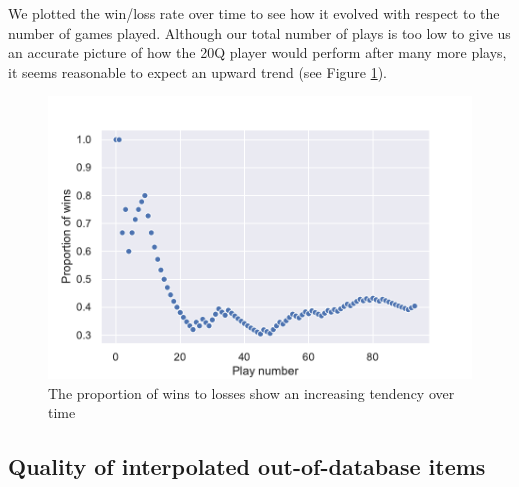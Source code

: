 \documentclass[11pt,a4paper]{article}
\begin{document}
We plotted the win/loss rate over time to see how it evolved with respect to the number of games played. Although our total number of plays is too low to give us an accurate picture of how the 20Q player would perform after many more plays, it seems reasonable to expect an upward trend (see Figure \ref{fig:win-over-time}).

\begin{figure}
    \centering
    \includegraphics[scale = .5]{graphics/stats-eval.pdf}
    \caption{The proportion of wins to losses show an increasing tendency over time}
    \label{fig:win-over-time}
\end{figure}

\subsection{Quality of interpolated out-of-database items}
\end{document}
